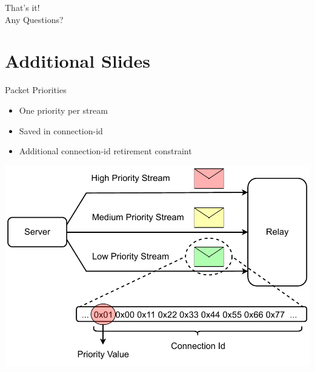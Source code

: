 \documentclass[shortpres,aspectratio=43]{beamer}
\newlength{\mylength}
\begin{document}
\begin{frame}
    \centering
    \Huge{That's it!}
    \\
    \vspace{4\mylength}
    \huge{Any Questions?}
\end{frame}


\section*{Additional Slides}

\begin{frame}{Packet Priorities}
    \begin{minipage}{0.43\textwidth}
        \begin{itemize}
            \item One priority per stream 
            \vspace{2\mylength}
            \item Saved in connection-id
            \vspace{2\mylength}
            \item Additional connection-id retirement constraint
        \end{itemize}
    \end{minipage}
    \begin{minipage}{0.55\textwidth}
        \includegraphics[scale=0.4]{../figures/03_fast_relays/priority-streams.drawio.pdf}
    \end{minipage}
\end{frame}
\end{document}
